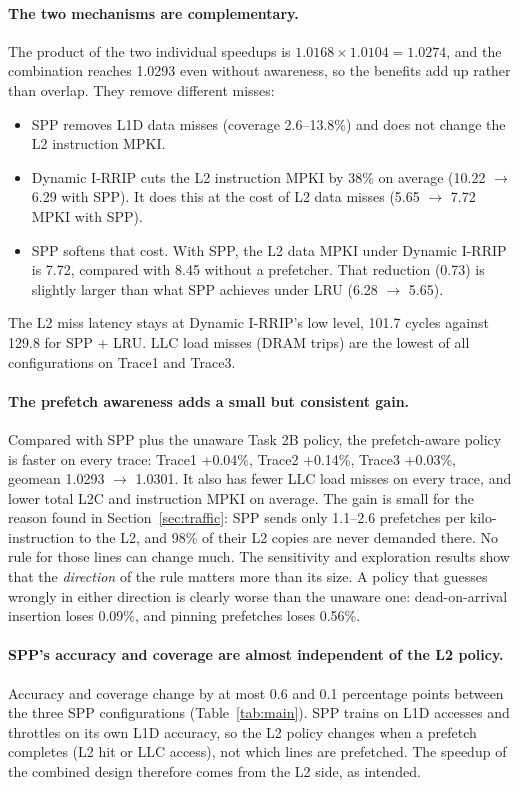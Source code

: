 \documentclass[11pt]{article}
\begin{document}
\paragraph{The two mechanisms are complementary.} The product of the two individual speedups is
$1.0168 \times 1.0104 = 1.0274$, and the combination reaches 1.0293 even without awareness, so the
benefits add up rather than overlap. They remove different misses:
\begin{itemize}
  \item SPP removes L1D data misses (coverage 2.6--13.8\%) and does not change the L2 instruction
        MPKI.
  \item Dynamic I-RRIP cuts the L2 instruction MPKI by 38\% on average (10.22 $\to$ 6.29 with SPP).
        It does this at the cost of L2 data misses (5.65 $\to$ 7.72 MPKI with SPP).
  \item SPP softens that cost. With SPP, the L2 data MPKI under Dynamic I-RRIP is 7.72, compared
        with 8.45 without a prefetcher. That reduction (0.73) is slightly larger than what SPP
        achieves under LRU (6.28 $\to$ 5.65).
\end{itemize}
The L2 miss latency stays at Dynamic I-RRIP's low level, 101.7 cycles against 129.8 for SPP +
LRU. LLC load misses (DRAM trips) are the lowest of all configurations on Trace1 and Trace3.

\paragraph{The prefetch awareness adds a small but consistent gain.} Compared with SPP plus the
unaware Task 2B policy, the prefetch-aware policy is faster on every trace: Trace1 +0.04\%,
Trace2 +0.14\%, Trace3 +0.03\%, geomean 1.0293 $\to$ 1.0301. It also has fewer LLC load misses
on every trace, and lower total L2C and instruction MPKI on average. The gain is small for the
reason found in Section~\ref{sec:traffic}: SPP sends only 1.1--2.6 prefetches per kilo-instruction
to the L2, and 98\% of their L2 copies are never demanded there. No rule for those lines can
change much. The sensitivity and exploration results show that the \emph{direction} of the rule
matters more than its size. A policy that guesses wrongly in either direction is clearly worse
than the unaware one: dead-on-arrival insertion loses 0.09\%, and pinning prefetches loses
0.56\%.

\paragraph{SPP's accuracy and coverage are almost independent of the L2 policy.} Accuracy and
coverage change by at most 0.6 and 0.1 percentage points between the three SPP configurations
(Table~\ref{tab:main}). SPP trains on L1D accesses and throttles on its own L1D accuracy, so the
L2 policy changes when a prefetch completes (L2 hit or LLC access), not which lines are
prefetched. The speedup of the combined design therefore comes from the L2 side, as intended.
\end{document}
